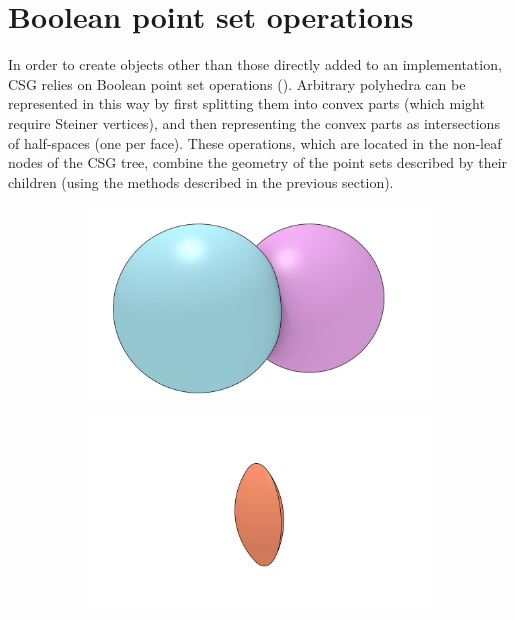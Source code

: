 \section{Boolean point set operations}

In order to create objects other than those directly added to an implementation, CSG relies on Boolean point set operations ().
Arbitrary polyhedra can be represented in this way by first splitting them into convex parts (which might require Steiner vertices), and then representing the convex parts as intersections of half-spaces (one per face).
These operations, which are located in the non-leaf nodes of the CSG tree, combine the geometry of the point sets described by their children (using the methods described in the previous section).

\begin{figure}
\centering
\begin{subfigure}[b]{0.5\linewidth}
\includegraphics[width=\linewidth]{figs/boolean}
\caption{}%
\label{subfig:boolean}
\end{subfigure}%
\begin{subfigure}[b]{0.5\linewidth}
\includegraphics[width=\linewidth]{figs/boolean-intersection}

\end{subfigure}
\end{figure}
